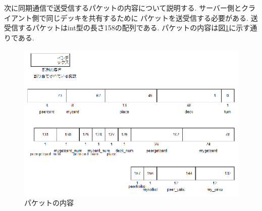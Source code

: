 \documentclass[a4j]{jarticle}
\begin{document}
    次に同期通信で送受信するパケットの内容について説明する. サーバー側とクライアント側で同じデッキを共有するために
    パケットを送受信する必要がある. 送受信するパケットはint型の長さ158の配列である. パケットの内容は図\ref{packet}に示す通りである.

    \begin{figure}[H]
    \centering
    \includegraphics[scale=2.0]{./img/packet.eps}
    \caption{パケットの内容}
    \label{packet}
    \end{figure}
\end{document}
